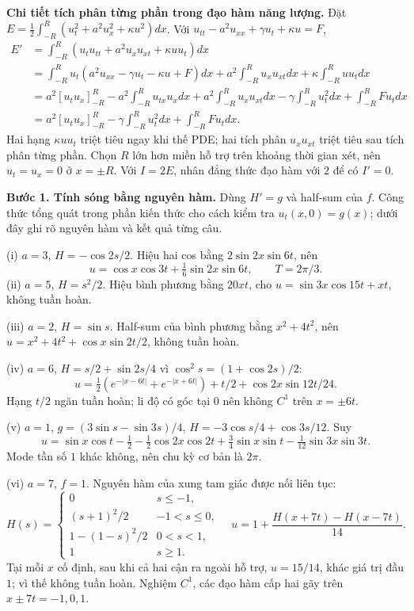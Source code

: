 \textbf{Chi tiết tích phân từng phần trong đạo hàm năng lượng.} Đặt $E=\frac12\int_{-R}^R(u_t^2+a^2u_x^2+\kappa u^2)dx$. Với $u_{tt}-a^2u_{xx}+\gamma u_t+\kappa u=F$,
\[\begin{aligned}
E'&=\int_{-R}^R(u_tu_{tt}+a^2u_xu_{xt}+\kappa uu_t)dx\\
&=\int_{-R}^Ru_t(a^2u_{xx}-\gamma u_t-\kappa u+F)dx
+a^2\int_{-R}^Ru_xu_{xt}dx+\kappa\int_{-R}^Ruu_tdx\\
&=a^2[u_tu_x]_{-R}^R-a^2\int_{-R}^Ru_{tx}u_xdx
+a^2\int_{-R}^Ru_xu_{xt}dx-\gamma\int_{-R}^Ru_t^2dx+\int_{-R}^RFu_tdx\\
&=a^2[u_tu_x]_{-R}^R-\gamma\int_{-R}^Ru_t^2dx+\int_{-R}^RFu_tdx.
\end{aligned}\]
Hai hạng $\kappa uu_t$ triệt tiêu ngay khi thế PDE; hai tích phân $u_xu_{xt}$ triệt tiêu sau tích phân từng phần. Chọn $R$ lớn hơn miền hỗ trợ trên khoảng thời gian xét, nên $u_t=u_x=0$ ở $x=\pm R$. Với $I=2E$, nhân đẳng thức đạo hàm với $2$ để có $I'=0$.

\textbf{Bước 1. Tính sóng bằng nguyên hàm.} Dùng $H'=g$ và half-sum của $f$. Công thức tổng quát trong phần kiến thức cho cách kiểm tra $u_t(x,0)=g(x)$; dưới đây ghi rõ nguyên hàm và kết quả từng câu.

(i) $a=3$, $H=-\cos2s/2$. Hiệu hai cos bằng $2\sin2x\sin6t$, nên
\[u=\cos x\cos3t+\tfrac16\sin2x\sin6t,\qquad T=2\pi/3.\]
(ii) $a=5$, $H=s^2/2$. Hiệu bình phương bằng $20xt$, cho $u=\sin3x\cos15t+xt$, không tuần hoàn.

(iii) $a=2$, $H=\sin s$. Half-sum của bình phương bằng $x^2+4t^2$, nên $u=x^2+4t^2+\cos x\sin2t/2$, không tuần hoàn.

(iv) $a=6$, $H=s/2+\sin2s/4$ vì $\cos^2s=(1+\cos2s)/2$:
\[u=\tfrac12(e^{-|x-6t|}+e^{-|x+6t|})+t/2+\cos2x\sin12t/24.\]
Hạng $t/2$ ngăn tuần hoàn; li độ có góc tại $0$ nên không $C^1$ trên $x=\pm6t$.

(v) $a=1$, $g=(3\sin s-\sin3s)/4$, $H=-3\cos s/4+\cos3s/12$. Suy
\[u=\sin x\cos t-\tfrac12-\tfrac12\cos2x\cos2t+\tfrac34\sin x\sin t-\tfrac1{12}\sin3x\sin3t.\]
Mode tần số $1$ khác không, nên chu kỳ cơ bản là $2\pi$.

(vi) $a=7$, $f=1$. Nguyên hàm của xung tam giác được nối liên tục:
\[H(s)=\begin{cases}0&s\le-1,\\(s+1)^2/2&-1<s\le0,\\1-(1-s)^2/2&0<s<1,\\1&s\ge1.\end{cases}\quad
u=1+\frac{H(x+7t)-H(x-7t)}{14}.\]
Tại mỗi $x$ cố định, sau khi cả hai cận ra ngoài hỗ trợ, $u=15/14$, khác giá trị đầu $1$; vì thế không tuần hoàn. Nghiệm $C^1$, các đạo hàm cấp hai gãy trên $x\pm7t=-1,0,1$.

